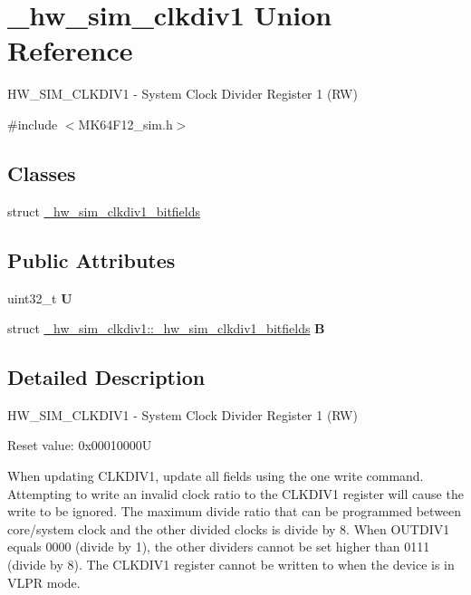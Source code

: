 \hypertarget{union__hw__sim__clkdiv1}{}\section{\+\_\+hw\+\_\+sim\+\_\+clkdiv1 Union Reference}
\label{union__hw__sim__clkdiv1}


H\+W\+\_\+\+S\+I\+M\+\_\+\+C\+L\+K\+D\+I\+V1 -\/ System Clock Divider Register 1 (RW)  




{\ttfamily \#include $<$M\+K64\+F12\+\_\+sim.\+h$>$}

\subsection*{Classes}
\begin{DoxyCompactItemize}
\item 
struct \hyperlink{struct__hw__sim__clkdiv1_1_1__hw__sim__clkdiv1__bitfields}{\+\_\+hw\+\_\+sim\+\_\+clkdiv1\+\_\+bitfields}
\end{DoxyCompactItemize}
\subsection*{Public Attributes}
\begin{DoxyCompactItemize}
\item 
uint32\+\_\+t {\bfseries U}\hypertarget{union__hw__sim__clkdiv1_a258e6ea05492bc065349d2cd3d0851ce}{}\label{union__hw__sim__clkdiv1_a258e6ea05492bc065349d2cd3d0851ce}

\item 
struct \hyperlink{struct__hw__sim__clkdiv1_1_1__hw__sim__clkdiv1__bitfields}{\+\_\+hw\+\_\+sim\+\_\+clkdiv1\+::\+\_\+hw\+\_\+sim\+\_\+clkdiv1\+\_\+bitfields} {\bfseries B}\hypertarget{union__hw__sim__clkdiv1_a92215774425757c6894f49b8565be7c3}{}\label{union__hw__sim__clkdiv1_a92215774425757c6894f49b8565be7c3}

\end{DoxyCompactItemize}


\subsection{Detailed Description}
H\+W\+\_\+\+S\+I\+M\+\_\+\+C\+L\+K\+D\+I\+V1 -\/ System Clock Divider Register 1 (RW) 

Reset value\+: 0x00010000U

When updating C\+L\+K\+D\+I\+V1, update all fields using the one write command. Attempting to write an invalid clock ratio to the C\+L\+K\+D\+I\+V1 register will cause the write to be ignored. The maximum divide ratio that can be programmed between core/system clock and the other divided clocks is divide by 8. When O\+U\+T\+D\+I\+V1 equals 0000 (divide by 1), the other dividers cannot be set higher than 0111 (divide by 8). The C\+L\+K\+D\+I\+V1 register cannot be written to when the device is in V\+L\+PR mode. 

